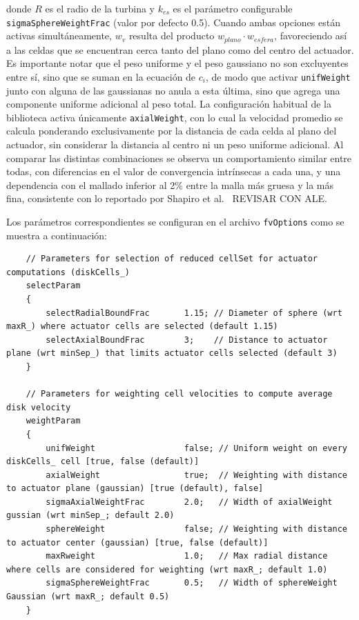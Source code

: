 donde $R$ es el radio de la turbina y $k_{es}$ es el parámetro configurable \texttt{sigmaSphereWeightFrac} (valor por defecto 0.5). Cuando ambas opciones están activas simultáneamente, $w_v$ resulta del producto $w_{plano} \cdot w_{esfera}$, favoreciendo así a las celdas que se encuentran cerca tanto del plano como del centro del actuador. Es importante notar que el peso uniforme y el peso gaussiano no son excluyentes entre sí, sino que se suman en la ecuación de $c_i$, de modo que activar \texttt{unifWeight} junto con alguna de las gaussianas no anula a esta última, sino que agrega una componente uniforme adicional al peso total.
La configuración habitual de la biblioteca activa únicamente \texttt{axialWeight}, con lo cual la velocidad promedio se calcula ponderando exclusivamente por la distancia de cada celda al plano del actuador, sin considerar la distancia al centro ni un peso uniforme adicional.
Al comparar las distintas combinaciones se observa un comportamiento similar entre todas, con diferencias en el valor de convergencia intrínsecas a cada una, y una dependencia con el mallado inferior al 2\% entre la malla más gruesa y la más fina, consistente con lo reportado por Shapiro et al.~\citep{shapiro2019} {\Large REVISAR CON ALE}.

Los parámetros correspondientes se configuran en el archivo \texttt{fvOptions} como se muestra a continuación:

\begin{scriptsize}
\begin{verbatim}
    // Parameters for selection of reduced cellSet for actuator computations (diskCells_)
    selectParam
    {
        selectRadialBoundFrac       1.15; // Diameter of sphere (wrt maxR_) where actuator cells are selected (default 1.15)
        selectAxialBoundFrac        3;    // Distance to actuator plane (wrt minSep_) that limits actuator cells selected (default 3)
    }

    // Parameters for weighting cell velocities to compute average disk velocity 
    weightParam
    {
        unifWeight                  false; // Uniform weight on every diskCells_ cell [true, false (default)]
        axialWeight                 true;  // Weighting with distance to actuator plane (gaussian) [true (default), false]
        sigmaAxialWeightFrac        2.0;   // Width of axialWeight gussian (wrt minSep_; default 2.0)
        sphereWeight                false; // Weighting with distance to actuator center (gaussian) [true, false (default)]
        maxRweight                  1.0;   // Max radial distance where cells are considered for weighting (wrt maxR_; default 1.0)
        sigmaSphereWeightFrac       0.5;   // Width of sphereWeight Gaussian (wrt maxR_; default 0.5)
    }
\end{verbatim}
\end{scriptsize}


